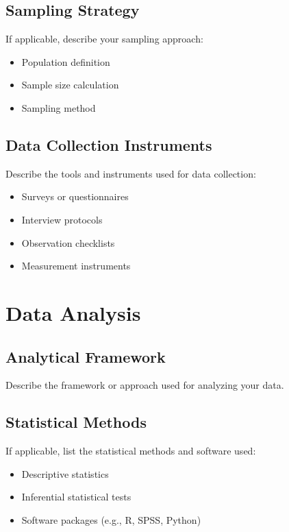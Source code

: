 \subsection{Sampling Strategy}

If applicable, describe your sampling approach:

\begin{itemize}
    \item Population definition
    \item Sample size calculation
    \item Sampling method
\end{itemize}

\subsection{Data Collection Instruments}

Describe the tools and instruments used for data collection:

\begin{itemize}
    \item Surveys or questionnaires
    \item Interview protocols
    \item Observation checklists
    \item Measurement instruments
\end{itemize}

\section{Data Analysis}

\subsection{Analytical Framework}

Describe the framework or approach used for analyzing your data.

\subsection{Statistical Methods}

If applicable, list the statistical methods and software used:

\begin{itemize}
    \item Descriptive statistics
    \item Inferential statistical tests
    \item Software packages (e.g., R, SPSS, Python)
\end{itemize}

